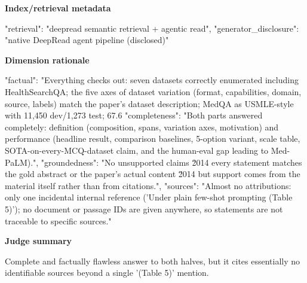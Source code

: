 \documentclass[10pt]{article}
\begin{document}
\textbf{Index/retrieval metadata}
\begin{EvidenceText}
{
  "retrieval": "deepread semantic retrieval + agentic read",
  "generator_disclosure": "native DeepRead agent pipeline (disclosed)"
}
\end{EvidenceText}

\textbf{Dimension rationale}
\begin{EvidenceText}
{
  "factual": "Everything checks out: seven datasets correctly enumerated including HealthSearchQA; the five axes of dataset variation (format, capabilities, domain, source, labels) match the paper's dataset description; MedQA as USMLE-style with 11,450 dev/1,273 test; 67.6%
  "completeness": "Both parts answered completely: definition (composition, spans, variation axes, motivation) and performance (headline result, comparison baselines, 5-option variant, scale table, SOTA-on-every-MCQ-dataset claim, and the human-eval gap leading to Med-PaLM).",
  "groundedness": "No unsupported claims \u2014 every statement matches the gold abstract or the paper's actual content \u2014 but support comes from the material itself rather than from citations.",
  "sources": "Almost no attributions: only one incidental internal reference ('Under plain few-shot prompting (Table 5)'); no document or passage IDs are given anywhere, so statements are not traceable to specific sources."
}
\end{EvidenceText}

\textbf{Judge summary}
\begin{EvidenceText}
Complete and factually flawless answer to both halves, but it cites essentially no identifiable sources beyond a single '(Table 5)' mention.
\end{EvidenceText}
\end{document}
